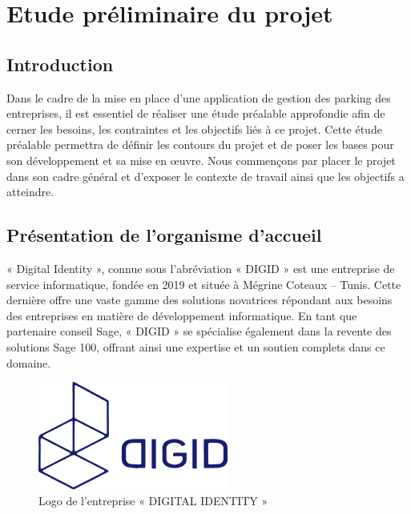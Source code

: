 



\chapter { Etude préliminaire du projet }

\section*{Introduction}
 Dans le cadre de la mise en place d'une application de gestion des parking des entreprises, il est essentiel de réaliser une étude préalable approfondie afin de cerner les besoins, les contraintes et les objectifs liés à ce projet. Cette étude préalable permettra de définir les contours du projet et de poser les bases pour son développement et sa mise en œuvre. 
 Nous commençons par placer le projet dans son cadre général et d'exposer le contexte de travail ainsi que  les objectifs a atteindre. 


\section{Présentation de l’organisme d’accueil}
\bigskip
« Digital Identity », connue sous l’abréviation « DIGID » est une entreprise de service
informatique, fondée en 2019 et située à Mégrine Coteaux – Tunis. Cette dernière offre une
vaste gamme des solutions novatrices répondant aux besoins des entreprises en matière de
développement informatique.
En tant que partenaire conseil Sage, « DIGID » se spécialise également dans la revente des
solutions Sage 100, offrant ainsi une expertise et un soutien complets dans ce domaine.

\begin{figure}[h]
    \centering
    \includegraphics[scale = 0.5]{chap1.images/digidlogo.png}
    \caption{Logo de l’entreprise « DIGITAL IDENTITY »}
    \label{Logo de l’entreprise « DIGITAL IDENTITY » }
\end{figure}


